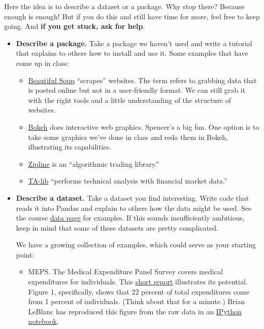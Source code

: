 \documentclass[11pt]{article}
\begin{document}
Here the idea is to describe a dataset or a package.
Why stop there?  Because enough is enough!  But if you do this and still have time
for more, feel free to keep going.
And {\bf if you get stuck, ask for help}.
\begin{itemize}

\item {\bf Describe a package.\/}
Take a package we haven't used and write a tutorial that explains to others how to install
and use it.  Some examples that have come up in class:

\begin{itemize}
\item \href{http://www.crummy.com/software/BeautifulSoup/bs4/doc/}
{Beautiful Soup} ``scrapes''  websites.
The term refers to grabbing data that is posted online but not in a user-friendly format.
We can still grab it with the right tools and a little understanding of the structure
of websites.

\item \href{http://bokeh.pydata.org/en/latest/docs/gallery.html}{Bokeh} does interactive web graphics.
Spencer's a big fan.
One option is to take some graphics we've done in class and redo them in Bokeh,
illustrating its capabilities.

\item \href{https://github.com/quantopian/zipline}{Zipline} is an
``algorithmic trading library.''

\item \href{https://github.com/mrjbq7/ta-lib}{TA-lib}
``performs technical analysis with financial market data.''
\end{itemize}


\item {\bf Describe a dataset.\/}
Take a dataset you find interesting.  Write code that reads it into Pandas
and explain to others how the data might be used.
See the course \href{}{data page}
for examples.
If this sounds insufficiently ambitious, keep in mind that some of these datasets
are pretty complicated.

We have a growing collection of examples, which could serve as your starting point:
\begin{itemize}
\item MEPS.  The Medical Expenditure Panel Survey covers medical expenditures for individuals.
This \href{http://www.nihcm.org/pdf/DataBrief3 Final.pdf}{short report} illustrates its potential.
Figure 1, specifically, shows that 22 percent of total expenditures come
from 1 percent of individuals.
(Think about that for a minute.)
Brian LeBlanc has reproduced this figure from the raw data in an
\href{https://github.com/NYUDataBootcamp/Materials/blob/master/Code/Lab/MEPS_data_experiment_Brian.ipynb}
{IPython notebook}.


\end{itemize}
\end{itemize}
\end{document}
